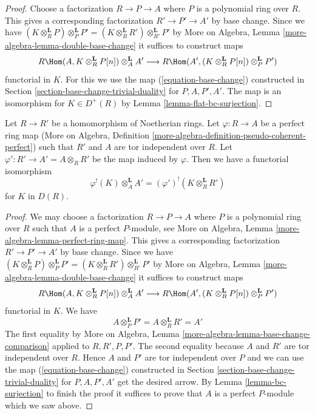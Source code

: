\begin{proof}
Choose a factorization $R \to P \to A$ where $P$ is a polynomial ring over $R$.
This gives a corresponding factorization $R' \to P' \to A'$ by base change.
Since we have $(K \otimes_R^\mathbf{L} P) \otimes_P^\mathbf{L} P' =
(K \otimes_R^\mathbf{L} R') \otimes_{R'}^\mathbf{L} P'$
by More on Algebra, Lemma \ref{more-algebra-lemma-double-base-change}
it suffices to construct maps
$$
R\Hom(A, K \otimes_R^\mathbf{L} P[n]) \otimes_A^\mathbf{L} A'
\longrightarrow
R\Hom(A', (K \otimes_R^\mathbf{L} P[n]) \otimes_P^\mathbf{L} P')
$$
functorial in $K$. For this we use the map (\ref{equation-base-change})
constructed in Section \ref{section-base-change-trivial-duality}
for $P, A, P', A'$.
The map is an isomorphism for $K \in D^+(R)$ by
Lemma \ref{lemma-flat-bc-surjection}.
\end{proof}

\begin{lemma}
\label{lemma-bc}
Let $R \to R'$ be a homomorphism of Noetherian rings.
Let $\varphi : R \to A$ be a perfect ring map
(More on Algebra, Definition
\ref{more-algebra-definition-pseudo-coherent-perfect})
such that $R'$ and $A$ are tor independent over $R$.
Let $\varphi' : R' \to A' = A \otimes_R R'$ be the map induced by $\varphi$.
Then we have a functorial isomorphism
$$
\varphi^!(K) \otimes_A^\mathbf{L} A' =
(\varphi')^!(K \otimes_R^\mathbf{L} R')
$$
for $K$ in $D(R)$.
\end{lemma}

\begin{proof}
We may choose a factorization $R \to P \to A$ where $P$
is a polynomial ring over $R$ such that $A$ is a perfect $P$-module, see
More on Algebra, Lemma \ref{more-algebra-lemma-perfect-ring-map}.
This gives a corresponding factorization $R' \to P' \to A'$ by base change.
Since we have $(K \otimes_R^\mathbf{L} P) \otimes_P^\mathbf{L} P' =
(K \otimes_R^\mathbf{L} R') \otimes_{R'}^\mathbf{L} P'$
by More on Algebra, Lemma \ref{more-algebra-lemma-double-base-change}
it suffices to construct maps
$$
R\Hom(A, K \otimes_R^\mathbf{L} P[n]) \otimes_A^\mathbf{L} A'
\longrightarrow
R\Hom(A', (K \otimes_R^\mathbf{L} P[n]) \otimes_P^\mathbf{L} P')
$$
functorial in $K$. We have
$$
A \otimes_P^\mathbf{L} P' = A \otimes_R^\mathbf{L} R' = A'
$$
The first equality by
More on Algebra, Lemma \ref{more-algebra-lemma-base-change-comparison}
applied to $R, R', P, P'$. The second equality because
$A$ and $R'$ are tor independent over $R$. Hence $A$ and $P'$ are
tor independent over $P$ and we can use the map (\ref{equation-base-change})
constructed in Section \ref{section-base-change-trivial-duality} for
$P, A, P', A'$
get the desired arrow. By Lemma \ref{lemma-bc-surjection}
to finish the proof it suffices to prove that $A$ is a perfect $P$-module
which we saw above.
\end{proof}

